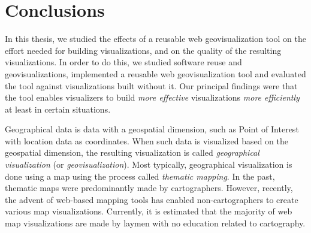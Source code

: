 
\chapter{Conclusions}
\label{chapter:conclusions}

In this thesis, we studied the effects of a reusable web geovisualization tool on the effort needed for building visualizations, and on the quality of the resulting visualizations. In order to do this, we studied software reuse and geovisualizations, implemented a reusable web geovisualization tool and evaluated the tool against visualizations built without it. Our principal findings were that the tool enables visualizers to build \emph{more effective} visualizations \emph{more efficiently} at least in certain situations.

Geographical data is data with a geospatial dimension, such as Point of Interest with location data as coordinates. When such data is visualized based on the geospatial dimension, the resulting visualization is called \emph{geographical visualization} (or \emph{geovisualization}). Most typically, geographical visualization is done using a map using the process called \emph{thematic mapping}. In the past, thematic maps were predominantly made by cartographers. However, recently, the advent of web-based mapping tools has enabled non-cartographers to create various map visualizations. Currently, it is estimated that the majority of web map visualizations are made by laymen with no education related to cartography.



